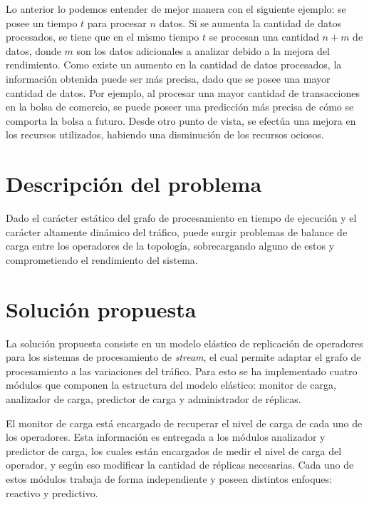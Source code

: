Lo anterior lo podemos entender de mejor manera con el siguiente ejemplo: se posee un tiempo $t$ para procesar $n$ datos\normalsize{. Si se aumenta} la cantidad de datos procesados, se tiene que en el mismo tiempo $t$ se procesan una cantidad $n+m$ de datos, donde $m$ son los datos adicionales a analizar debido a la mejora del rendimiento. Como existe un aumento en la cantidad de datos procesados, la información obtenida puede ser más precisa, dado que se posee una mayor cantidad de datos. Por ejemplo, al procesar una mayor cantidad de transacciones en la bolsa de comercio, se puede poseer una predicción más precisa de cómo se comporta la bolsa a futuro. Desde otro punto de vista, se efectúa una mejora en los recursos utilizados, habiendo una disminución de los recursos ociosos.

\section{Descripción del problema}
\label{intro:problema}


Dado el carácter estático del grafo de procesamiento en tiempo de ejecución y el carácter altamente dinámico del tráfico, puede surgir problemas de balance de carga entre los operadores de la topología, sobrecargando alguno de estos y comprometiendo el rendimiento del sistema.

\section{Solución propuesta}
\label{intro:solucion}

La solución propuesta consiste en un modelo elástico de replicación de operadores para los sistemas de procesamiento de \textit{stream}, el cual permite adaptar el grafo de procesamiento a las variaciones del tráfico. Para esto se ha implementado cuatro módulos que componen la estructura del modelo elástico: monitor de carga, analizador de carga, predictor de carga y administrador de réplicas.

El monitor de carga está encargado de recuperar el nivel de carga de cada uno de los operadores. Esta información es entregada a los módulos analizador y predictor de carga, los cuales están encargados de medir el nivel de carga del operador, y según eso modificar la cantidad de réplicas necesarias. Cada uno de estos módulos trabaja de forma independiente y poseen distintos enfoques: reactivo y predictivo.

